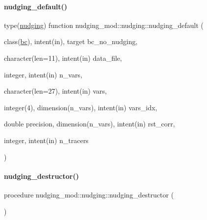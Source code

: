 \paragraph{\texorpdfstring{nudging\+\_\+default()}{nudging\_default()}}
{\footnotesize\ttfamily type(\mbox{\hyperlink{structnudging__mod_1_1nudging}{nudging}}) function nudging\+\_\+mod\+::nudging\+::nudging\+\_\+default (\begin{DoxyParamCaption}\item[{class(\mbox{\hyperlink{structbc__mod_1_1bc}{bc}}), intent(in), target}]{bc\+\_\+no\+\_\+nudging,  }\item[{character(len=11), intent(in)}]{data\+\_\+file,  }\item[{integer, intent(in)}]{n\+\_\+vars,  }\item[{character(len=27), intent(in)}]{vars,  }\item[{integer(4), dimension(n\+\_\+vars), intent(in)}]{vars\+\_\+idx,  }\item[{double precision, dimension(n\+\_\+vars), intent(in)}]{rst\+\_\+corr,  }\item[{integer, intent(in)}]{n\+\_\+tracers }\end{DoxyParamCaption})\hspace{0.3cm}{\ttfamily [private]}}

\mbox{\label{structnudging__mod_1_1nudging_a4b48102a07133bda1873e536608761c7}} 
\paragraph{\texorpdfstring{nudging\+\_\+destructor()}{nudging\_destructor()}}
{\footnotesize\ttfamily procedure nudging\+\_\+mod\+::nudging\+::nudging\+\_\+destructor (\begin{DoxyParamCaption}{ }\end{DoxyParamCaption})\hspace{0.3cm}{\ttfamily [private]}}

\mbox{\label{structnudging__mod_1_1nudging_ab17fe87aa8dc77bd4bf0cba14d68969a}} 
